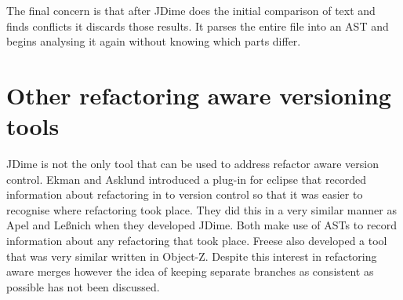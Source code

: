 
The final concern is that after JDime does the initial comparison of text and finds conflicts it discards those results. It parses the entire file into an AST and begins analysing it again without knowing which parts differ.   

\section{Other refactoring aware versioning tools}
JDime is not the only tool that can be used to address refactor aware version control.  Ekman and Asklund \cite{Ekman2004} introduced a plug-in for eclipse that recorded information about refactoring in to version control so that it was easier to recognise where refactoring took place.  They did this in a very similar manner as Apel and Le{\ss}nich when they developed JDime.  Both make use of ASTs to record information about any refactoring that took place.  Freese \cite{Freese2006} also developed a tool that was very similar written in Object-Z. Despite this interest in refactoring aware merges however the idea of keeping separate branches as consistent as possible has not been discussed.
